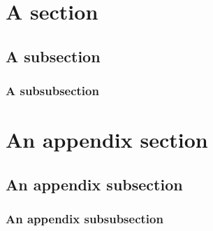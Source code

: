 \documentclass[10pt,twoside,fleqn,french,english]{actuecon}
\author{First Author}
\affil{First Author's Affiliation}
\author{Second Author}
\affil{Second Author's Affiliation}
\date{} %
\begin{document}
	
	
	\captionsetup[table]{format=actuecon}
	\captionsetup[figure]{format=actuecon}
	
	\setcounter{page}{3}
	
	
	\maketitle
	\thispagestyle{empty}			
	
	\begin{AEresume}
	\end{AEresume}

	\begin{AEabstract}
	\end{AEabstract}

	\AEintroduction
	
		       	
	\AEsectionsDeveloppement
	
		\section{A section}
						
		\subsection{A subsection}
								 
		\subsubsection{A subsubsection}
				
	\AEconclusion
	
		
	\AEappendix
	
		\section{An appendix section}
		
		\subsection{An appendix subsection}
		
		\subsubsection{An appendix subsubsection}
							
	\AEbibliographie
	
	
		
\end{document}
